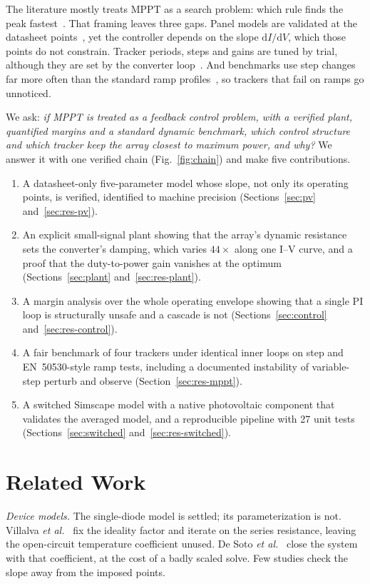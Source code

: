 \documentclass[journal]{IEEEtran}
\begin{document}
The literature mostly treats MPPT as a search problem: which rule finds the peak fastest~\cite{esram}.
That framing leaves three gaps. Panel models are validated at the datasheet points~\cite{villalva}, yet
the controller depends on the slope $\mathrm{d}I/\mathrm{d}V$, which those points do not constrain.
Tracker periods, steps and gains are tuned by trial, although they are set by the converter
loop~\cite{femia}. And benchmarks use step changes far more often than the standard ramp
profiles~\cite{en50530}, so trackers that fail on ramps go unnoticed.

We ask: \emph{if MPPT is treated as a feedback control problem, with a verified plant, quantified
margins and a standard dynamic benchmark, which control structure and which tracker keep the array
closest to maximum power, and why?} We answer it with one verified chain (Fig.~\ref{fig:chain}) and make
five contributions.
\begin{enumerate}
\item A datasheet-only five-parameter model whose slope, not only its operating points, is verified,
identified to machine precision (Sections~\ref{sec:pv} and~\ref{sec:res-pv}).
\item An explicit small-signal plant showing that the array's dynamic resistance sets the converter's
damping, which varies $44\times$ along one I--V curve, and a proof that the duty-to-power gain vanishes at
the optimum (Sections~\ref{sec:plant} and~\ref{sec:res-plant}).
\item A margin analysis over the whole operating envelope showing that a single PI loop is structurally
unsafe and a cascade is not (Sections~\ref{sec:control} and~\ref{sec:res-control}).
\item A fair benchmark of four trackers under identical inner loops on step and EN~50530-style ramp tests,
including a documented instability of variable-step perturb and observe (Section~\ref{sec:res-mppt}).
\item A switched Simscape model with a native photovoltaic component that validates the averaged model,
and a reproducible pipeline with 27 unit tests (Sections~\ref{sec:switched} and~\ref{sec:res-switched}).
\end{enumerate}

\section{Related Work}
\label{sec:related}
\emph{Device models.} The single-diode model is settled; its parameterization is not. Villalva
\emph{et al.}~\cite{villalva} fix the ideality factor and iterate on the series resistance, leaving the
open-circuit temperature coefficient unused. De Soto \emph{et al.}~\cite{desoto} close the system with that
coefficient, at the cost of a badly scaled solve. Few studies check the slope away from the imposed points.
\end{document}
